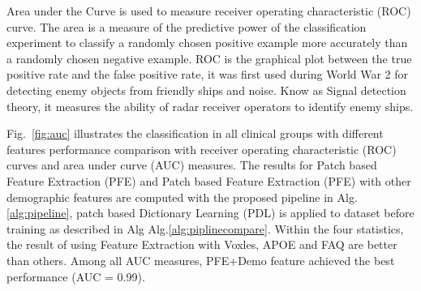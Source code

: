 \documentclass[authoryear,preprint,revi	ew,12pt]{elsarticle}
\begin{document}
Area under the Curve is used to measure receiver operating characteristic (ROC) curve. The area is a measure of the predictive power of the classification experiment to classify a  randomly chosen positive example more accurately than a randomly chosen negative example. ROC is the graphical plot between the true positive rate and the false positive rate, it was first used during World War 2 for detecting enemy objects from friendly ships and noise. Know as Signal detection theory, it measures the ability of radar receiver operators to identify enemy ships.

Fig.~\ref{fig:auc} illustrates the classification in all clinical groups with different features performance comparison with receiver operating characteristic (ROC) curves and area under curve (AUC) measures. The results for Patch based Feature Extraction (PFE) and Patch based Feature Extraction (PFE)  with other demographic features are computed with the proposed pipeline in Alg.\ref{alg:pipeline}, patch based Dictionary Learning (PDL) is applied to dataset before training as described in Alg Alg.\ref{alg:piplinecompare}. Within the four statistics, the result of using Feature Extraction with Voxles, APOE and FAQ are better than others. Among all AUC measures, PFE+Demo feature achieved the best performance (AUC = 0.99).
	
\end{document}

